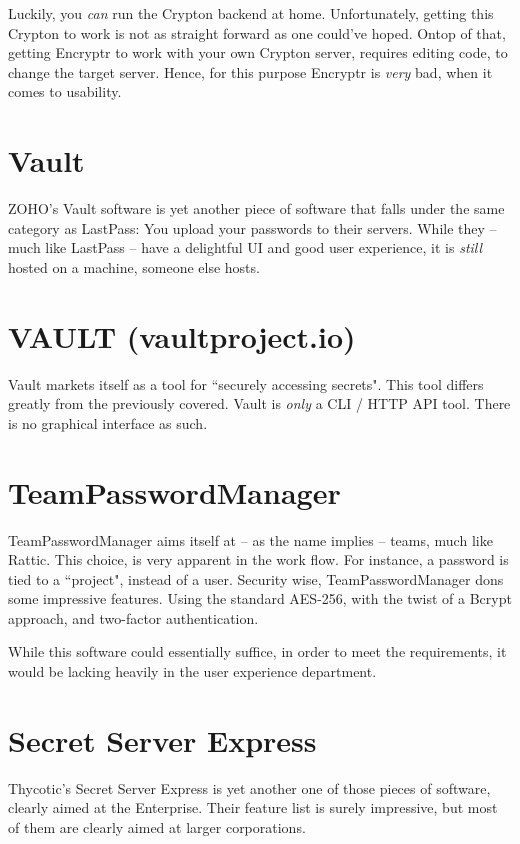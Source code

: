 \documentclass[a4paper,10pt]{article}
\begin{document}
	Luckily, you \emph{can} run the Crypton backend at home. Unfortunately, getting this Crypton to work is not as straight forward as one could've hoped. Ontop of that, getting Encryptr to work with your own Crypton server, requires editing code, to change the target server. Hence, for this purpose Encryptr is \emph{very} bad, when it comes to usability.

\section{Vault}
	ZOHO's Vault software is yet another piece of software that falls under the same category as LastPass: You upload your passwords to their servers. While they -- much like LastPass -- have a delightful UI and good user experience, it is \emph{still} hosted on a machine, someone else hosts.

	
\section{VAULT (vaultproject.io)}
	Vault markets itself as a tool for ``securely accessing secrets". This tool differs greatly from the previously covered. Vault is \emph{only} a CLI / HTTP API tool. There is no graphical interface as such.

\section{TeamPasswordManager}
	TeamPasswordManager aims itself at -- as the name implies -- teams, much like Rattic. This choice, is very apparent in the work flow. For instance, a password is tied to a ``project", instead of a user. Security wise, TeamPasswordManager dons some impressive features. Using the standard AES-256, with the twist of a Bcrypt approach, and two-factor authentication.

	While this software could essentially suffice, in order to meet the requirements, it would be lacking heavily in the user experience department.



\section{Secret Server Express}
	Thycotic's Secret Server Express is yet another one of those pieces of software, clearly aimed at the Enterprise. Their feature list is surely impressive, but most of them are clearly aimed at larger corporations. 
\end{document}
